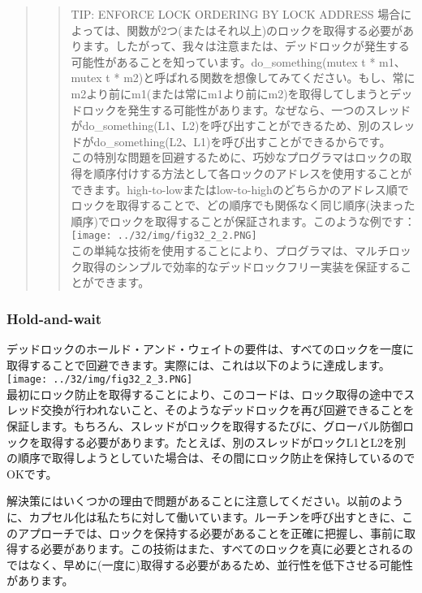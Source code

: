 \begin{quote}
\begin{quote}
TIP: ENFORCE LOCK ORDERING BY LOCK ADDRESS
場合によっては、関数が2つ(またはそれ以上)のロックを取得する必要があります。したがって、我々は注意または、デッドロックが発生する可能性があることを知っています。do\_something(mutex
t * m1、mutex t *
m2)と呼ばれる関数を想像してみてください。もし、常にm2より前にm1(または常にm1より前にm2)を取得してしまうとデッドロックを発生する可能性があります。なぜなら、一つのスレッドがdo\_something(L1、L2)を呼び出すことができるため、別のスレッドがdo\_something(L2、L1)を呼び出すことができるからです。\\
この特別な問題を回避するために、巧妙なプログラマはロックの取得を順序付けする方法として各ロックのアドレスを使用することができます。high-to-lowまたはlow-to-highのどちらかのアドレス順でロックを取得することで、どの順序でも関係なく同じ順序(決まった順序)でロックを取得することが保証されます。このような例です：\\
\texttt{[image: ../32/img/fig32\_2\_2.PNG]}\\
この単純な技術を使用することにより、プログラマは、マルチロック取得のシンプルで効率的なデッドロックフリー実装を保証することができます。
\end{quote}
\end{quote}

\hypertarget{hold-and-wait}{%
\subsubsection*{Hold-and-wait}\label{hold-and-wait}}

デッドロックのホールド・アンド・ウェイトの要件は、すべてのロックを一度に取得することで回避できます。実際には、これは以下のように達成します。\\
\texttt{[image: ../32/img/fig32\_2\_3.PNG]}\\
最初にロック防止を取得することにより、このコードは、ロック取得の途中でスレッド交換が行われないこと、そのようなデッドロックを再び回避できることを保証します。もちろん、スレッドがロックを取得するたびに、グローバル防御ロックを取得する必要があります。たとえば、別のスレッドがロックL1とL2を別の順序で取得しようとしていた場合は、その間にロック防止を保持しているのでOKです。

解決策にはいくつかの理由で問題があることに注意してください。以前のように、カプセル化は私たちに対して働いています。ルーチンを呼び出すときに、このアプローチでは、ロックを保持する必要があることを正確に把握し、事前に取得する必要があります。この技術はまた、すべてのロックを真に必要とされるのではなく、早めに(一度に)取得する必要があるため、並行性を低下させる可能性があります。

